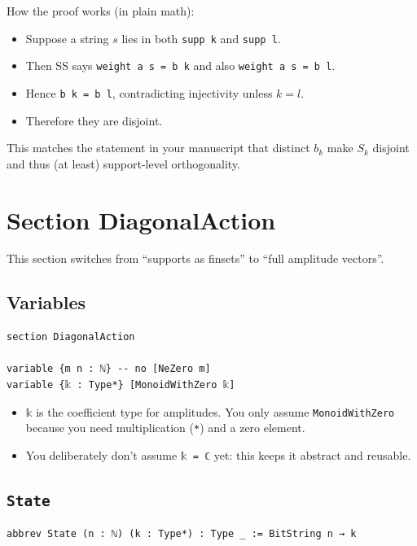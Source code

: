 \documentclass[11pt]{article}
\begin{document}
How the proof works (in plain math):
\begin{itemize}
\item Suppose a string $s$ lies in both \texttt{supp k} and \texttt{supp l}.
\item Then SS says \texttt{weight a s = b k} and also \texttt{weight a s = b l}.
\item Hence \texttt{b k = b l}, contradicting injectivity unless $k=l$.
\item Therefore they are disjoint.
\end{itemize}

This matches the statement in your manuscript that distinct $b_k$ make $S_k$ disjoint and thus (at least) support-level orthogonality.

\section*{Section DiagonalAction}

This section switches from ``supports as finsets'' to ``full amplitude vectors''.

\subsection*{Variables}

\begin{lstlisting}
section DiagonalAction

variable {m n : ℕ} -- no [NeZero m]
variable {𝕜 : Type*} [MonoidWithZero 𝕜]
\end{lstlisting}

\begin{itemize}
\item \texttt{𝕜} is the coefficient type for amplitudes. You only assume \texttt{MonoidWithZero} because you need multiplication (\texttt{*}) and a zero element.
\item You deliberately don't assume \texttt{𝕜 = ℂ} yet: this keeps it abstract and reusable.
\end{itemize}

\subsection*{\texttt{State}}

\begin{lstlisting}
abbrev State (n : ℕ) (k : Type*) : Type _ := BitString n → k
\end{lstlisting}
\end{document}
